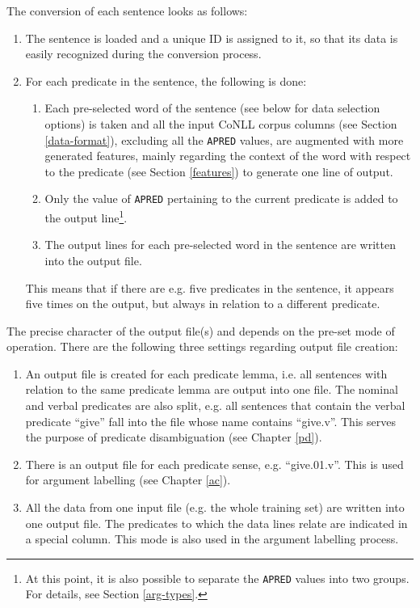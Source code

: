 \documentclass[12pt,notitlepage]{report}
\begin{document}
The conversion of each sentence looks as follows:
\begin{enumerate}
    \item The sentence is loaded and a unique ID is assigned to it, so that its data is easily recognized during the conversion process.
    \item For each predicate in the sentence, the following is done:
    \begin{enumerate}
        \item Each pre-selected word of the sentence (see below for data selection options) is taken and all the input CoNLL corpus columns (see Section \ref{data-format}), excluding all the \texttt{APRED} values, are augmented with more generated features, mainly regarding the context of the word with respect to the predicate (see Section \ref{features}) to generate one line of output.
        \item Only the value of \texttt{APRED} pertaining to the current predicate is added to the output line\footnote{At this point, it is also possible to separate the \texttt{APRED} values into two groups. For details, see Section \ref{arg-types}.}.
        \item The output lines for each pre-selected word in the sentence are written into the output file.
    \end{enumerate}
    This means that if there are e.g. five predicates in the sentence, it appears five times on the output, but always in relation to a different predicate.
\end{enumerate}

The precise character of the output file(s) and depends on the pre-set mode of operation. There are the following three settings regarding output file creation:
\begin{enumerate}
    \item An output file is created for each predicate lemma, i.e. all sentences with relation to the same predicate lemma are output into one file. The nominal and verbal predicates are also split, e.g. all sentences that contain the verbal predicate ``give'' fall into the file whose name contains ``give.v''. This serves the purpose of predicate disambiguation (see Chapter \ref{pd}).
    \item There is an output file for each predicate sense, e.g. ``give.01.v''. This is used for argument labelling (see Chapter \ref{ac}).
    \item All the data from one input file (e.g. the whole training set) are written into one output file. The predicates to which the data lines relate are indicated in a special column. This mode is also used in the argument labelling process.
\end{enumerate}
\end{document}
